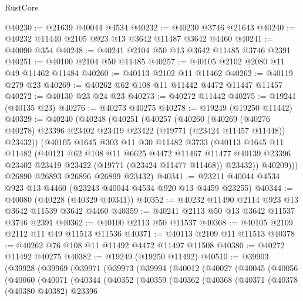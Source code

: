 \begin{lexlean}{RustCore}
\begin{coremodule}
@40230 := @21639 @40044 @4534
@40232 := @40230 @3746 @21643
@40240 := @40232 @11440 @2105 @923 @13 @3642 @11487 @3642 @4460
@40241 := @40090 @354
@40248 := @40241 @2104 @50 @13 @3642 @11485 @3746 @2391
@40251 := @40100 @2104 @50 @11485
@40257 := @40105 @2102 @2080 @11 @49 @11462 @11484
@40260 := @40113 @2102 @11 @11462
@40262 := @40119 @279 @23
@40269 := @40262 @62 @108 @11 @11442 @4472 @11447 @11457
@40272 := @40130 @23 @24 @23
@40273 := @40272 @11442
@40275 := @19241 (@40135 @23)
@40276 := @40273 @40275
@40278 := @19249 (@19250 @11442)
@40329 := @40240
    (@40248
      (@40251
        (@40257
          (@40260
            (@40269
              (@40276 @40278)
              @23396
              @23402
              @23419
              @23422
              (@19771 (@23424 @11457 @11448))
              @23432))
          (@40105
            @1645
            @303
            @11
            @30
            @11482
            @3733
            (@40113
              @1645
              @11
              @11482
              (@40121
                @62
                @108
                @11
                @6625
                @4472
                @11467
                @11477
                @40139
                @23396
                @23402
                @23419
                @23422
                (@19771 (@23424 @11477 @11468))
                @23432))
            @40209)))
      @26890
      @26893
      @26896
      @26899
      @23432)
@40341 := @23211 @40044 @4534 @923 @13 @4460 (@23243 @40044 @4534 @920 @13 @4459 @23255)
@40344 := @40080 (@40228 (@40329 @40341))
@40352 := @40232 @11490 @2114 @923 @13 @3642 @11539 @3642 @4460
@40359 := @40241 @2113 @50 @13 @3642 @11537 @3746 @2391
@40362 := @40100 @2113 @50 @11537
@40368 := @40105 @2109 @2112 @11 @49 @11513 @11536
@40371 := @40113 @2109 @11 @11513
@40378 := @40262 @76 @108 @11 @11492 @4472 @11497 @11508
@40380 := @40272 @11492 @40275
@40382 := @19249 (@19250 @11492)
@40510 := @39903
    (@39928
      (@39969
        (@39971
          (@39973
            (@39994
              (@40012
                (@40027
                  (@40045
                    (@40056
                      (@40060
                        (@40071
                          (@40344
                            (@40352
                              (@40359
                                (@40362
                                  (@40368
                                    (@40371
                                      (@40378
                                        (@40380 @40382)
                                        @23396

\end{coremodule}
\end{lexlean}
